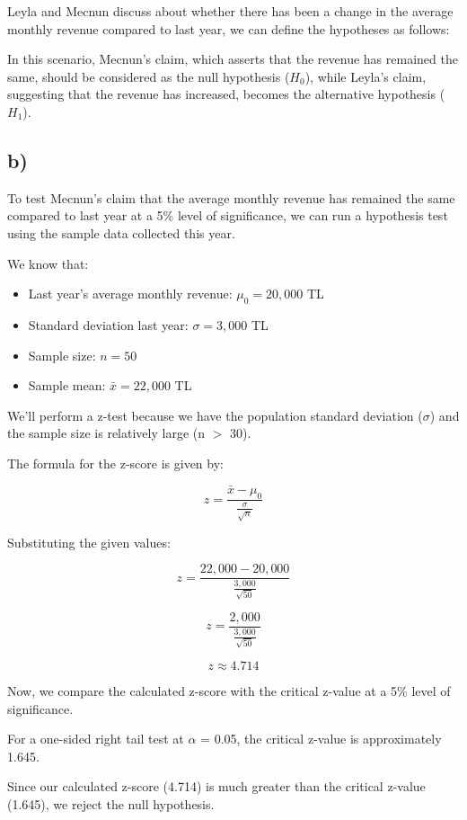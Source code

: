 \documentclass[12pt]{article}
\begin{document}
Leyla and Mecnun discuss about whether there has been a change in the average monthly revenue compared to last year, we can define the hypotheses as follows:

In this scenario, Mecnun's claim, which asserts that the revenue has remained the same, should be considered as the null hypothesis (\(H_0\)), while Leyla's claim, suggesting that the revenue has increased, becomes the alternative hypothesis (\(H_1\)).

\subsection*{b)} 

To test Mecnun's claim that the average monthly revenue has remained the same compared to last year at a 5\% level 
of significance, we can run a hypothesis test using the sample data collected this year.

We know that: 
\begin{itemize}
    \item Last year's average monthly revenue: $\mu_0 = 20,000$ TL
    \item Standard deviation last year: $\sigma = 3,000$ TL
    \item Sample size: $n = 50$
    \item Sample mean: $\bar{x} = 22,000$ TL
\end{itemize}

We'll perform a z-test because we have the population standard deviation (\(\sigma\)) and the sample size is relatively large (n \(>\) 30).

The formula for the z-score is given by:

\[ z = \frac{\bar{x} - \mu_0}{\frac{\sigma}{\sqrt{n}}} \]

Substituting the given values:

\[ z = \frac{22,000 - 20,000}{\frac{3,000}{\sqrt{50}}} \]

\[ z = \frac{2,000}{\frac{3,000}{\sqrt{50}}} \]

\[ z \approx 4.714 \]

Now, we compare the calculated z-score with the critical z-value at a 5\% level of significance.

For a one-sided right tail test at $\alpha$ = 0.05, the critical z-value is approximately 1.645.

Since our calculated z-score (4.714) is much greater than the critical z-value (1.645), we reject the null hypothesis.
\end{document}
